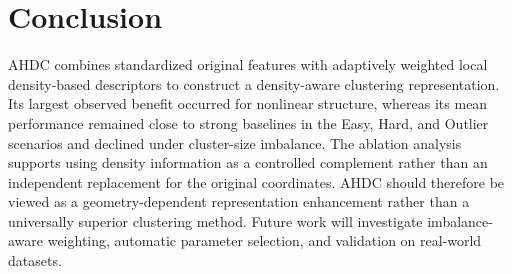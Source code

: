 \documentclass[twoside]{article}
\begin{document}
\section{Conclusion}
AHDC combines standardized original features with adaptively weighted local density-based descriptors to construct a density-aware clustering representation. Its largest observed benefit occurred for nonlinear structure, whereas its mean performance remained close to strong baselines in the Easy, Hard, and Outlier scenarios and declined under cluster-size imbalance. The ablation analysis supports using density information as a controlled complement rather than an independent replacement for the original coordinates. AHDC should therefore be viewed as a geometry-dependent representation enhancement rather than a universally superior clustering method. Future work will investigate imbalance-aware weighting, automatic parameter selection, and validation on real-world datasets.
\end{document}
